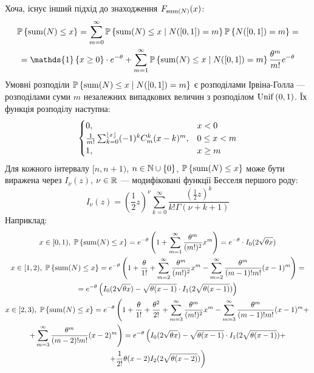 Хоча, існує інший підхід до знаходження $F_{\Sum(N)}(x)$:
\begin{gather*}
    \P{\Sum(N) \leq x} = 
    \sum_{m=0}^{\infty} \P{\Sum(N) \leq x \mid N([0, 1]) = m} \P{N([0, 1]) = m}
    = \\ = \mathds{1}\left\{x\geq 0\right\}\cdot e^{-\theta} +
    \sum_{m=1}^{\infty} \P{\Sum(N) \leq x \mid N([0, 1]) = m} \frac{\theta^m}{m!} e^{-\theta}
\end{gather*}
Умовні розподіли $\P{\Sum(N) \leq x \mid N([0, 1]) = m}$
є розподілами Ірвіна-Голла --- розподілами 
суми $m$ незалежних випадкових величин з розподілом $\Unif{0, 1}$. Їх
функція розподілу наступна:
\begin{gather*}
    \begin{cases}
        0, & x < 0 \\
        \frac{1}{m!}\sum_{k=0}^{\floor*{x}} (-1)^k C_m^k (x-k)^m, & 0 \leq x < m \\
        1, & x \geq m
    \end{cases}
\end{gather*}
Для кожного інтервалу $[n, n+1)$, $n\in \N \cup \{0 \}$, 
$\P{\Sum(N) \leq x}$  може бути виражена через $I_{\nu}(z)$, $\nu \in \R$  ---
модифіковані функції Бесселя першого роду:
\begin{equation*}
    I_{\nu}(z) = \left(\frac{1}{2} z\right)^{\nu}
    \sum_{k=0}^{\infty} \frac{
        \left(\frac{1}{2} z\right)^{k}
    }{
        k! \Gamma(\nu + k + 1)
    }
\end{equation*}
Наприклад:
\begin{gather*}
    x\in[0, 1),\; \P{\Sum(N) \leq x} = 
    e^{-\theta}\left(1 + 
    \sum_{m=1}^{\infty}
    \frac{\theta^m}{(m!)^2} x^m\right) = 
    e^{-\theta} \cdot I_0(2\sqrt{\theta x}) \\
    x\in[1, 2), \; 
    \P{\Sum(N) \leq x} = 
    e^{-\theta}\left(1 + \frac{\theta}{1!} + 
    \sum_{m=2}^{\infty}\frac{\theta^m}{(m!)^2} x^m -
    \sum_{m=2}^{\infty}\frac{\theta^m}{(m-1)!m!}(x-1)^m \right) = \\
    = e^{-\theta}\left(
        I_0(2\sqrt{\theta x}) - \sqrt{\theta(x-1)} \cdot I_1(2\sqrt{\theta(x-1)})
    \right) \\
    x\in[2, 3), \;
    \P{\Sum(N) \leq x} = 
    e^{-\theta}\left(
        1 + \frac{\theta}{1!} + \frac{\theta^2}{2!} + 
        \sum_{m=3}^{\infty}\frac{\theta^m}{(m!)^2} x^m -
        \sum_{m=3}^{\infty}\frac{\theta^m}{(m-1)!m!}(x-1)^m + \right. \\ \left. + 
        \sum_{m=3}^{\infty}\frac{\theta^m}{(m-2)!m!}(x-2)^m
    \right) = 
    e^{-\theta}\left(
        I_0(2\sqrt{\theta x}) - \sqrt{\theta (x-1) } \cdot I_1(2\sqrt{\theta (x-1)}) + \right. \\ \left.
        +\frac{1}{2!}\theta(x-2) I_2(2\sqrt{\theta (x-2)})
    \right)
\end{gather*}
